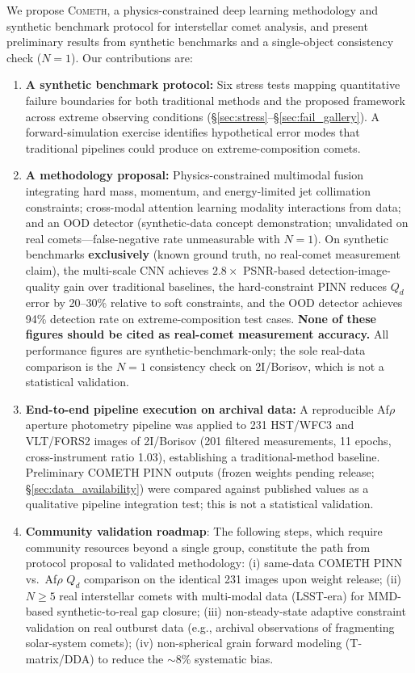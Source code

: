 \documentclass[usenatbib]{mnras}
\begin{document}
We propose \textsc{Cometh}, a physics-constrained deep learning methodology and synthetic benchmark protocol for interstellar comet analysis, and present preliminary results from synthetic benchmarks and a single-object consistency check ($N=1$). Our contributions are:

\begin{enumerate}
    \item \textbf{A synthetic benchmark protocol:} Six stress tests mapping quantitative failure boundaries for both traditional methods and the proposed framework across extreme observing conditions (\S\ref{sec:stress}--\S\ref{sec:fail_gallery}). A forward-simulation exercise identifies hypothetical error modes that traditional pipelines could produce on extreme-composition comets.
    \item \textbf{A methodology proposal:} Physics-constrained multimodal fusion integrating hard mass, momentum, and energy-limited jet collimation constraints; cross-modal attention learning modality interactions from data; and an OOD detector (synthetic-data concept demonstration; unvalidated on real comets---false-negative rate unmeasurable with $N=1$). On synthetic benchmarks \textbf{exclusively} (known ground truth, no real-comet measurement claim), the multi-scale CNN achieves $2.8\times$ PSNR-based detection-image-quality gain over traditional baselines, the hard-constraint PINN reduces $Q_d$ error by 20--30\% relative to soft constraints, and the OOD detector achieves 94\% detection rate on extreme-composition test cases. \textbf{None of these figures should be cited as real-comet measurement accuracy.} All performance figures are synthetic-benchmark-only; the sole real-data comparison is the $N=1$ consistency check on 2I/Borisov, which is not a statistical validation.
    \item \textbf{End-to-end pipeline execution on archival data:} A reproducible Af$\rho$ aperture photometry pipeline was applied to 231 HST/WFC3 and VLT/FORS2 images of 2I/Borisov (201 filtered measurements, 11 epochs, cross-instrument ratio 1.03), establishing a traditional-method baseline. Preliminary COMETH PINN outputs (frozen weights pending release; \S\ref{sec:data_availability}) were compared against published values as a qualitative pipeline integration test; this is not a statistical validation.
    \item \textbf{Community validation roadmap}\label{sec:roadmap}: The following steps, which require community resources beyond a single group, constitute the path from protocol proposal to validated methodology: (i) same-data COMETH PINN vs.\ Af$\rho$ $Q_d$ comparison on the identical 231 images upon weight release; (ii) $N \geq 5$ real interstellar comets with multi-modal data (LSST-era) for MMD-based synthetic-to-real gap closure; (iii) non-steady-state adaptive constraint validation on real outburst data (e.g., archival observations of fragmenting solar-system comets); (iv) non-spherical grain forward modeling (T-matrix/DDA) to reduce the $\sim$8\% systematic bias.
\end{enumerate}
\end{document}
